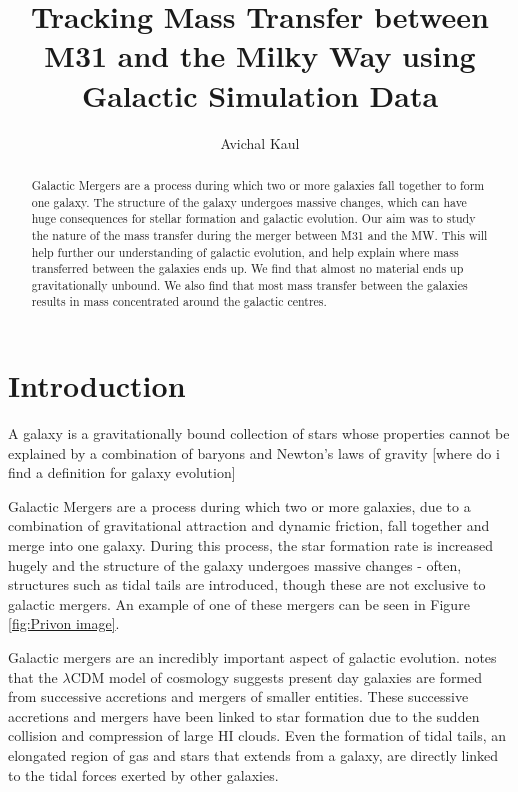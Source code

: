 \documentclass[linenumbers]{aastex631} %
\begin{document}
\title{Tracking Mass Transfer between M31 and the Milky Way using Galactic Simulation Data}




\author{Avichal Kaul}

\begin{abstract}
Galactic Mergers are a process during which two or more galaxies fall together to form one galaxy. The structure of the galaxy undergoes massive changes, which can have huge consequences for stellar formation and galactic evolution. Our aim was to study the nature of the mass transfer during the merger between M31 and the MW. This will help further our understanding of galactic evolution, and help explain where mass transferred between the galaxies ends up. We find that almost no material ends up gravitationally unbound. We also find that most mass transfer between the galaxies results in mass concentrated around the galactic centres. 
\end{abstract}




\section{Introduction}

A galaxy is a gravitationally bound collection of stars whose properties
cannot be explained by a combination of baryons and Newton’s laws of gravity \citep{Willman_Strader_2012} [where do i find a definition for galaxy evolution]


Galactic Mergers are a process during which two or more galaxies, due to a combination of gravitational attraction and dynamic friction, fall together and merge into one galaxy. During this process, the star formation rate is increased hugely \citep{Moster_2011} and the structure of the galaxy undergoes massive changes - often, structures such as tidal tails are introduced, though these are not exclusive to galactic mergers. An example of one of these mergers can be seen in Figure \ref{fig:Privon image}.


Galactic mergers are an incredibly important aspect of galactic evolution. \citep{1978MNRAS.183..341W} notes that the $\lambda\text{CDM}$ model of cosmology suggests present day galaxies are formed from successive accretions and mergers of smaller entities. These successive accretions and mergers have been linked to star formation \citep{Barnes_2004} due to the sudden collision and compression of large HI clouds. Even the formation of tidal tails, an elongated region of gas and stars that extends from a galaxy, are directly linked to the tidal forces exerted by other galaxies.
\end{document}
